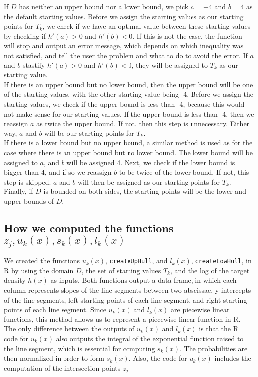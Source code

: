 \documentclass[12pt]{article}
\begin{document}
If $D$ has neither an upper bound nor a lower bound, we pick $a = -4$ and $b = 4$ as the default starting values.  Before we assign the starting values as our starting points for $T_k$, we check if we have an optimal value between these starting values by checking if $h'(a) > 0$ and $h'(b) < 0$.  If this is not the case, the function will stop and output an error message, which depends on which inequality was not satisfied, and tell the user the problem and what to do to avoid the error.  If $a$ and $b$ stastify $h'(a) > 0$ and $h'(b) < 0$, they will be assigned to $T_k$ as our starting value.\\

If there is an upper bound but no lower bound, then the upper bound will be one of the starting values, with the other starting value being -4.  Before we assign the starting values, we check if the upper bound is less than -4, because this would not make sense for our starting values.  If the upper bound is less than -4, then we reassign $a$ as twice the upper bound.  If not, then this step is unnecessary.  Either way, $a$ and $b$ will be our starting points for $T_k$.\\

If there is a lower bound but no upper bound, a similar method is used as for the case where there is an upper bound but no lower bound.  The lower bound will be assigned to $a$, and $b$ will be assigned 4.  Next, we check if the lower bound is bigger than 4, and if so we reassign $b$ to be twice of the lower bound. If not, this step is skipped.  $a$ and $b$ will then be assigned as our starting points for $T_k$.\\

Finally, if $D$ is bounded on both sides, the starting points will be the lower and upper bounds of $D$.

\subsection*{How we computed the functions $z_j, u_k(x), s_k(x), l_k(x)$}

We created the functions $u_k(x)$, \texttt{createUpHull}, and $l_k(x)$, \texttt{createLowHull}, in \textsf{R} by using the domain $D$, the set of starting values $T_k$, and the log of the target density $h(x)$ as inputs.  Both functions output a data frame, in which each column represents slopes of the line segments between two abscissae, y intercepts of the line segments, left starting points of each line segment, and right starting points of each line segment.  Since $u_k(x)$ and $l_k(x)$ are piecewise linear functions, this method allows us to represent a piecewise linear function in \textsf{R}.  The only difference between the outputs of $u_k(x)$ and $l_k(x)$ is that the \textsf{R} code for $u_k(x)$ also outputs the integral of the exponential function raised to the line segment, which is essential for computing $s_k(x)$.  The probabilities are then normalized in order to form $s_k(x)$.  Also, the code for $u_k(x)$ includes the computation of the intersection points $z_j$.  
\end{document}
